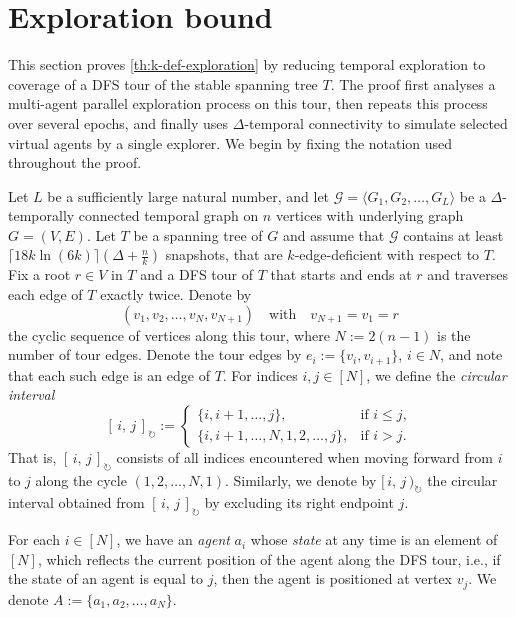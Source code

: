 \documentclass[a4paper,11pt]{article}
\theoremstyle{definition}
\theoremstyle{remark}
\newcommand{\cG}{\ensuremath{\mathcal{G}}}
\newcommand{\cint}[2]{[\,#1,\,#2\,]_{\circlearrowright}}
\newcommand{\coint}[2]{[\,#1,\,#2\,)_{\circlearrowright}}
\begin{document}
	\section{Exploration bound}
	\label{sec:bound}

    This section proves \cref{th:k-def-exploration} by reducing temporal exploration to coverage of a DFS tour of the stable spanning tree $T$. The proof first analyses a multi-agent parallel exploration process on this tour, then repeats this process over several epochs, and finally uses $\Delta$-temporal connectivity to simulate selected virtual agents by a single explorer. We begin by fixing the notation used throughout the proof.

    Let $L$ be a sufficiently large natural number, and
	let $\cG=\langle G_1,G_2,\dots,G_L\rangle$ be a $\Delta$-temporally connected temporal graph on $n$ vertices with underlying
	graph $G=(V,E)$. Let $T$ be a spanning tree of $G$ and assume that $\cG$ contains at least $\lceil 18k \ln{(6k)} \rceil(\Delta+ \frac{n}{k})$ snapshots, that are $k$-edge-deficient with respect to $T$.
    Fix a root $r \in V$ in $T$ and a DFS tour of $T$ that starts and ends at $r$ and traverses
	each edge of $T$ exactly twice. Denote by
	\[
		(v_1, v_2, \ldots, v_N, v_{N+1}) \quad\text{with}\quad v_{N+1}=v_1=r
	\]
	the cyclic sequence of vertices along this tour, where $N:=2(n-1)$ is the number
	of tour edges. 
	Denote the tour edges by $e_i:=\{v_i,v_{i+1}\}$, $i \in N$, and note that each such edge is an edge of $T$.
	For indices $i, j \in [N]$, we define the \emph{circular interval}
	\[
		\cint{i}{j} :=
		\begin{cases}
			\{i, i+1, \dots, j\}, & \text{if } i \le j,\\[4pt]
			\{i, i+1, \dots, N, 1, 2, \dots, j\}, & \text{if } i > j.
		\end{cases}
	\]
	That is, $\cint{i}{j}$ consists of all indices encountered when moving forward from $i$ to $j$ along the cycle $(1,2, \ldots, N, 1)$. Similarly, we denote by $\coint{i}{j}$ the circular interval obtained from $\cint{i}{j}$ by excluding its right endpoint $j$.

	For each $i \in [N]$, we have an \emph{agent} $a_i$ whose \emph{state} at any time is an element of $[N]$, which reflects the current position of the agent along the DFS tour, i.e., if the state of an agent is equal to $j$, then the agent is positioned at vertex $v_j$. 
	We denote $A := \{a_1, a_2, \ldots, a_N \}$.
	
\end{document}
